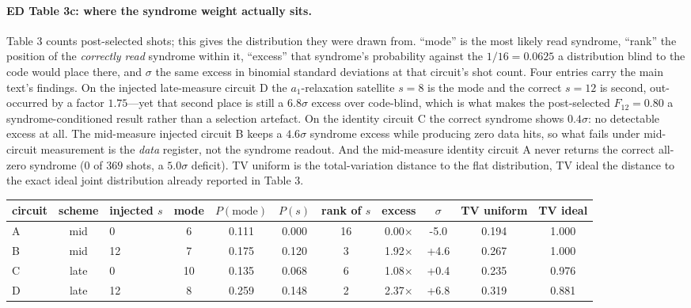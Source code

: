 \documentclass[10pt,a4paper]{article}
\begin{document}
\paragraph*{ED Table 3c: where the syndrome weight actually sits.}
Table 3 counts post-selected shots; this gives the distribution they were drawn
from.  ``mode'' is the most likely read syndrome, ``rank'' the position of the
\emph{correctly read} syndrome within it, ``excess'' that syndrome's probability
against the $1/16=0.0625$ a distribution blind to the code would place there, and
$\sigma$ the same excess in binomial standard deviations at that circuit's shot
count.  Four entries carry the main text's findings.  On the injected late-measure
circuit D the $a_1$-relaxation satellite $s=8$ is the mode and the correct $s=12$
is second, out-occurred by a factor $1.75$---yet that second place is still a
$6.8\sigma$ excess over code-blind, which is what makes the post-selected
$F_{12}=0.80$ a syndrome-conditioned result rather than a selection artefact.  On
the identity circuit C the correct syndrome shows $0.4\sigma$: no detectable
excess at all.  The mid-measure injected circuit B keeps a $4.6\sigma$ syndrome
excess while producing zero data hits, so what fails under mid-circuit measurement
is the \emph{data} register, not the syndrome readout.  And the mid-measure
identity circuit A never returns the correct all-zero syndrome ($0$ of $369$ shots,
a $5.0\sigma$ deficit).  TV uniform is the total-variation distance to the flat
distribution, TV ideal the distance to the exact ideal joint distribution already
reported in Table 3.
\begin{longtable}{lclcccccccc}
\toprule circuit & scheme & injected $s$ & mode & $P(\mathrm{mode})$ & $P(s)$ & rank of $s$ & excess & $\sigma$ & TV uniform & TV ideal \\ \midrule
A & mid & 0 & 6 & 0.111 & 0.000 & 16 & 0.00$\times$ & -5.0 & 0.194 & 1.000 \\
B & mid & 12 & 7 & 0.175 & 0.120 & 3 & 1.92$\times$ & +4.6 & 0.267 & 1.000 \\
C & late & 0 & 10 & 0.135 & 0.068 & 6 & 1.08$\times$ & +0.4 & 0.235 & 0.976 \\
D & late & 12 & 8 & 0.259 & 0.148 & 2 & 2.37$\times$ & +6.8 & 0.319 & 0.881 \\
\bottomrule\end{longtable}
\end{document}
